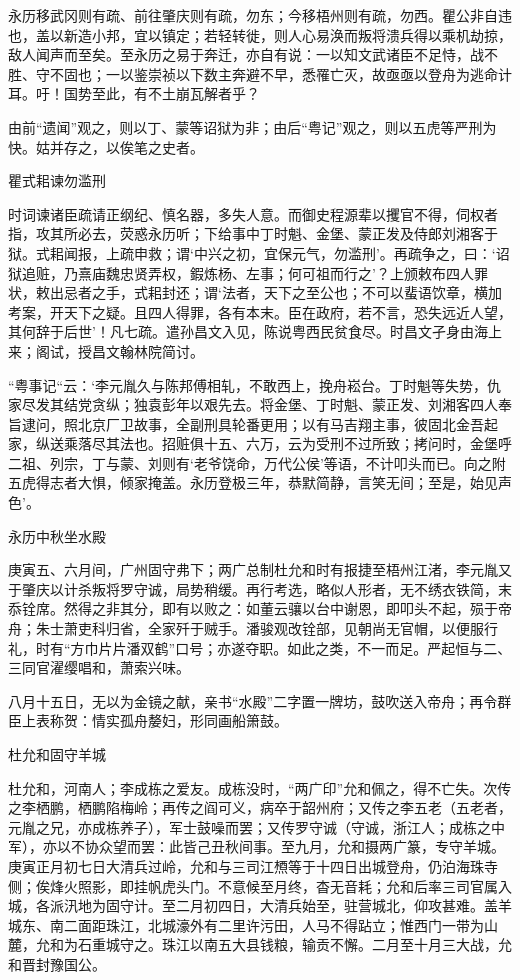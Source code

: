 \documentclass[]{article}
\begin{document}
永历移武冈则有疏、前往肇庆则有疏，勿东；今移梧州则有疏，勿西。瞿公非自违也，盖以新造小邦，宜以镇定；若轻转徙，则人心易涣而叛将溃兵得以乘机劫掠，敌人闻声而至矣。至永历之易于奔迁，亦自有说：一以知文武诸臣不足恃，战不胜、守不固也；一以鉴崇祯以下数主奔避不早，悉罹亡灭，故亟亟以登舟为逃命计耳。吁！国势至此，有不土崩瓦解者乎？

由前``遗闻''观之，则以丁、蒙等诏狱为非；由后``粤记''观之，则以五虎等严刑为快。姑并存之，以俟笔之史者。

瞿式耜谏勿滥刑

时词谏诸臣疏请正纲纪、慎名器，多失人意。而御史程源辈以攫官不得，伺权者指，攻其所必去，荧惑永历听；下给事中丁时魁、金堡、蒙正发及侍郎刘湘客于狱。式耜闻报，上疏申救；谓`中兴之初，宜保元气，勿滥刑'。再疏争之，曰：`诏狱追赃，乃熹庙魏忠贤弄权，鍜炼杨、左事；何可祖而行之'？上颁敕布四人罪状，敕出忌者之手，式耜封还；谓`法者，天下之至公也；不可以蜚语饮章，横加考案，开天下之疑。且四人得罪，各有本末。臣在政府，若不言，恐失远近人望，其何辞于后世'！凡七疏。遣孙昌文入见，陈说粤西民贫食尽。时昌文孑身由海上来；阁试，授昌文翰林院简讨。

``粤事记``云：`李元胤久与陈邦傅相轧，不敢西上，挽舟崧台。丁时魁等失势，仇家尽发其结党贪纵；独袁彭年以艰先去。将金堡、丁时魁、蒙正发、刘湘客四人奉旨逮问，照北京厂卫故事，全副刑具轮番更用；以有马吉翔主事，彼固北金吾起家，纵送乘落尽其法也。招赃俱十五、六万，云为受刑不过所致；拷问时，金堡呼二祖、列宗，丁与蒙、刘则有`老爷饶命，万代公侯'等语，不计叩头而已。向之附五虎得志者大惧，倾家掩盖。永历登极三年，恭默简静，言笑无间；至是，始见声色'。

永历中秋坐水殿

庚寅五、六月间，广州固守弗下；两广总制杜允和时有报捷至梧州江渚，李元胤又于肇庆以计杀叛将罗守诚，局势稍缓。再行考选，略似人形者，无不绣衣铁简，末忝铨席。然得之非其分，即有以败之：如董云骧以台中谢恩，即叩头不起，殒于帝舟；朱士萧吏科归省，全家歼于贼手。潘骏观改铨部，见朝尚无官帽，以便服行礼，时有``方巾片片潘双鹤''口号；亦遂夺职。如此之类，不一而足。严起恒与二、三同官濯缨唱和，萧索兴味。

八月十五日，无以为金镜之献，亲书``水殿''二字置一牌坊，鼓吹送入帝舟；再令群臣上表称贺：情实孤舟嫠妇，形同画船箫鼓。

杜允和固守羊城

杜允和，河南人；李成栋之爱友。成栋没时，``两广印''允和佩之，得不亡失。次传之李栖鹏，栖鹏陷梅岭；再传之阎可义，病卒于韶州府；又传之李五老（五老者，元胤之兄，亦成栋养子），军士鼓噪而罢；又传罗守诚（守诚，浙江人；成栋之中军），亦以不协众望而罢：此皆己丑秋间事。至九月，允和摄两广篆，专守羊城。庚寅正月初七日大清兵过岭，允和与三司江槱等于十四日出城登舟，仍泊海珠寺侧；俟烽火照影，即挂帆虎头门。不意候至月终，杳无音耗；允和后率三司官属入城，各派汛地为固守计。至二月初四日，大清兵始至，驻营城北，仰攻甚难。盖羊城东、南二面距珠江，北城濠外有二里许污田，人马不得跕立；惟西门一带为山麓，允和为石重城守之。珠江以南五大县钱粮，输贡不懈。二月至十月三大战，允和晋封豫国公。
\end{document}
